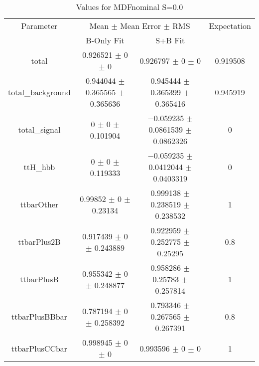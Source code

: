 \begin{table}
\centering
\caption{Values for MDFnominal S=0.0}
\begin{tabular}{cccc}
\toprule
Parameter & \multicolumn{2}{c}{Mean $\pm$ Mean Error $\pm$ RMS} & Expectation\\
 & B-Only Fit & S+B Fit & \\
\midrule
total & \num{0.926521} $\pm$ \num{0} $\pm$ \num{0} & \num{0.926797} $\pm$ \num{0} $\pm$ \num{0} & \num{0.919508}\\
total\_background & \num{0.944044} $\pm$ \num{0.365565} $\pm$ \num{0.365636} & \num{0.945444} $\pm$ \num{0.365399} $\pm$ \num{0.365416} & \num{0.945919}\\
total\_signal & \num{0} $\pm$ \num{0} $\pm$ \num{0.101904} & \num{-0.059235} $\pm$ \num{0.0861539} $\pm$ \num{0.0862326} & \num{0}\\
ttH\_hbb & \num{0} $\pm$ \num{0} $\pm$ \num{0.119333} & \num{-0.059235} $\pm$ \num{0.0412044} $\pm$ \num{0.0403319} & \num{0}\\
ttbarOther & \num{0.99852} $\pm$ \num{0} $\pm$ \num{0.23134} & \num{0.999138} $\pm$ \num{0.238519} $\pm$ \num{0.238532} & \num{1}\\
ttbarPlus2B & \num{0.917439} $\pm$ \num{0} $\pm$ \num{0.243889} & \num{0.922959} $\pm$ \num{0.252775} $\pm$ \num{0.25295} & \num{0.8}\\
ttbarPlusB & \num{0.955342} $\pm$ \num{0} $\pm$ \num{0.248877} & \num{0.958286} $\pm$ \num{0.25783} $\pm$ \num{0.257814} & \num{1}\\
ttbarPlusBBbar & \num{0.787194} $\pm$ \num{0} $\pm$ \num{0.258392} & \num{0.793346} $\pm$ \num{0.267565} $\pm$ \num{0.267391} & \num{0.8}\\
ttbarPlusCCbar & \num{0.998945} $\pm$ \num{0} $\pm$ \num{0} & \num{0.993596} $\pm$ \num{0} $\pm$ \num{0} & \num{1}\\
\bottomrule
\end{tabular}
\end{table}